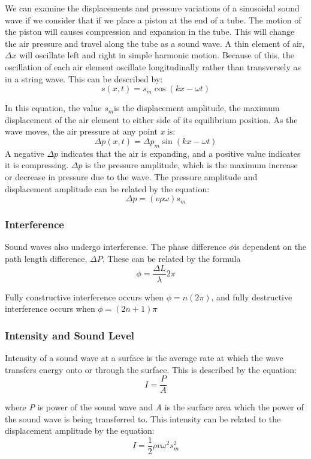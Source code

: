 \documentclass[english]{article}
\begin{document}
We can examine the displacements and pressure variations of a sinusoidal
sound wave if we consider that if we place a piston at the end of
a tube. The motion of the piston will causes compression and expansion
in the tube. This will change the air pressure and travel along the
tube as a sound wave. A thin element of air, $\Delta x$ will oscillate
left and right in simple harmonic motion. Because of this, the oscillation
of each air element oscillate longitudinally rather than transversely
as in a string wave. This can be described by:
\[
s(x,t)=s_{m}\cos(kx-\omega t)
\]


In this equation, the value $s_{m}$is the displacement amplitude,
the maximum displacement of the air element to either side of its
equilibrium position. As the wave moves, the air pressure at any point
\emph{x }is:
\[
\Delta p(x,t)=\Delta p_{m}\sin(kx-\omega t)
\]
A negative $\Delta p$ indicates that the air is expanding, and a
positive value indicates it is compressing. $\Delta p$ is the pressure
amplitude, which is the maximum increase or decrease in pressure due
to the wave. The pressure amplitude and displacement amplitude can
be related by the equation:
\[
\Delta p=(v\rho\omega)s_{m}
\]



\subsubsection*{Interference}

Sound waves also undergo interference. The phase difference $\phi$is
dependent on the path length difference, $\Delta P$. These can be
related by the formula
\[
\phi=\frac{\Delta L}{\lambda}2\pi
\]


Fully constructive interference occurs when $\phi=n(2\pi)$, and fully
destructive interference occurs when $\phi=(2n+1)\pi$


\subsubsection*{Intensity and Sound Level}

Intensity of a sound wave at a surface is the average rate at which
the wave transfers energy onto or through the surface. This is described
by the equation:
\[
I=\frac{P}{A}
\]


where \emph{P }is power of the sound wave and \emph{A }is the surface
area which the power of the sound wave is being transferred to. This
intensity can be related to the displacement amplitude by the equation:
\[
I=\frac{1}{2}\rho v\omega^{2}s_{m}^{2}
\]
\end{document}
